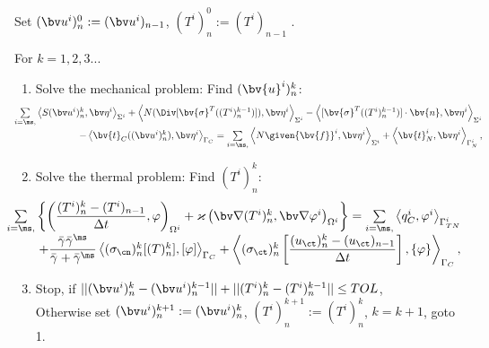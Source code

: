Set $(\bv u^i)^0_n:=(\bv u^i)_{n-1}$, $(T^i)^0_n:=(T^i)_{n-1}$
.

For $k=1,2,3...$ 
\begin{enumerate}
\item Solve the mechanical problem: Find $(\bv{u}^i)^k_n$:
\begin{equation} \label{DDWeakMech}
\hspace*{-10mm}
\begin{array}{r}
\sum \limits_{i=\ms,\sl}  
\left\langle S (\bv u^i)^k_n, \bv \eta^i \right\rangle_{\Sigma^i} 
+ \left\langle  N (\Div[\bv{\sigma}^T((T^i)^{k-1}_n)]), \bv \eta^i \right\rangle_{\Sigma^i}
- \left\langle [\bv{\sigma}^T((T^i)^{k-1}_n)] \cdot \bv{n}, \bv \eta^i\right\rangle_{\Sigma^i} \\[2ex]
- \left\langle \bv{t}_C((\bv u^i)^k_n), \bv \eta^i \right\rangle_{\Gamma_C} 
= \sum \limits_{i=\ms,\sl} 
\left\langle N \given{\bv{f}}^i, \bv \eta^i \right\rangle_{\Sigma^i}
+ \left\langle \bv{t}^i_N, \bv \eta^i \right\rangle_{\Gamma_N^i},
\end{array}
\end{equation}
\item Solve the thermal problem: Find $(T^i)^k_n$:
\begin{equation} \label{DDWeakThermo}
\hspace*{-10mm}
\begin{array}{r}
\sum \limits_{i=\ms,\sl} \left\lbrace 
\left(\dfrac{(T^i)^k_n - (T^i)_{n-1}}{\Delta t},\varphi \right)_{\Omega^i} 
+ \varkappa \left(\bv \nabla (T^i)^k_n, \bv \nabla \varphi^i \right)_{\Omega^i} \right\rbrace 
= \sum \limits_{i=\ms,\sl} 
\left\langle q_{C}^i,\varphi^i \right\rangle_{\Gamma^i_{TN}} \\
+ \dfrac{\bar{\gamma}^{\sl} \bar{\gamma}^{\ms}}{\bar{\gamma}^{\sl} + \bar{\gamma}^{\ms}} \left\langle (\sigma_\cn)^{k}_n [(T)^k_n], [\varphi] \right\rangle_{\Gamma_C}
+ \left\langle (\sigma_\ct)^k_n \left[\dfrac{(u_\ct)^k_n - (u_\ct)_{n-1}}{\Delta t}\right], \{\varphi\} \right\rangle_{\Gamma_C},
\end{array}
\end{equation}
\item Stop, if $||(\bv u^i)^k_n - (\bv u^i)^{k-1}_n|| + ||(T^i)^k_n - (T^i)^{k-1}_n|| \leq TOL$,\\
 Otherwise set $(\bv u^i)^{k+1}_n:=(\bv u^i)^k_n$, $(T^i)^{k+1}_n:=(T^i)^k_n$, $k=k+1$, goto 1.
\end{enumerate}

